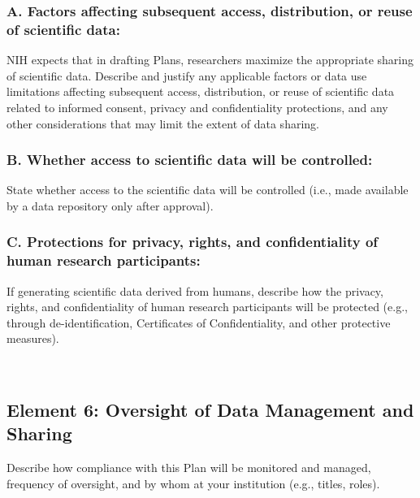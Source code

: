 \subsubsection*{A. Factors affecting subsequent access, distribution, or reuse of scientific data:}

NIH expects that in drafting Plans, researchers maximize the appropriate sharing of scientific data. Describe and justify any applicable factors or data use limitations affecting subsequent access, distribution, or reuse of scientific data related to informed consent, privacy and confidentiality protections, and any other considerations that may limit the extent of data sharing. 

\subsubsection*{B. Whether access to scientific data will be controlled:}

State whether access to the scientific data will be controlled (i.e., made available by a data repository only after approval).

\subsubsection*{C. Protections for privacy, rights, and confidentiality of human research participants:}

If generating scientific data derived from humans, describe how the privacy, rights, and confidentiality of human research participants will be protected (e.g., through de-identification, Certificates of Confidentiality, and other protective measures). 

~

\subsection*{Element 6: Oversight of Data Management and Sharing}

Describe how compliance with this Plan will be monitored and managed, frequency of oversight, and by whom at your institution (e.g., titles, roles).

